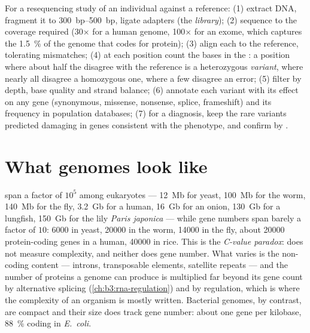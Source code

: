 \begin{method}\label{met:b3:genomics:pipeline}
For a resequencing study of an individual against a reference: (1)
extract DNA, fragment it to \qtyrange{300}{500}{bp}, ligate adapters
(the \emph{library}); (2) sequence to the coverage required (30$\times$
for a human genome, 100$\times$ for an exome, which captures the
\qty{1.5}{\%} of the genome that codes for protein); (3) align each
 to the reference, tolerating mismatches; (4) at each position
count the bases in the : a position where about half the 
disagree with the reference is a heterozygous \emph{variant}, where
nearly all disagree a homozygous one, where a few disagree an error;
(5) filter by depth, base quality and strand balance; (6) annotate each
variant with its effect on any gene (synonymous, missense, nonsense,
splice, frameshift) and its frequency in population databases; (7) for
a diagnosis, keep the rare variants predicted damaging in genes
consistent with the phenotype, and confirm by .
\end{method}

\section{What genomes look like}

\begin{proposition}\label{prop:b3:genomics:sizes}
 span a factor of $10^{5}$ among eukaryotes ---
\qty{12}{Mb} for yeast, \qty{100}{Mb} for the worm, \qty{140}{Mb} for
the fly, \qty{3.2}{Gb} for a human, \qty{16}{Gb} for an onion,
\qty{130}{Gb} for a lungfish, \qty{150}{Gb} for the lily \emph{Paris
japonica} --- while gene numbers span barely a factor of $10$:
\num{6000} in yeast, \num{20000} in the worm, \num{14000} in the fly,
about \num{20000} protein-coding genes in a human, \num{40000} in rice.
This is the \emph{C-value paradox}:  does not measure
complexity, and neither does gene number. What varies is the non-coding
content --- introns, transposable elements, satellite repeats --- and
the number of proteins a genome can produce is multiplied far beyond
its gene count by alternative splicing (\cref{ch:b3:rna-regulation})
and by regulation, which is where the complexity of an organism is
mostly written. Bacterial genomes, by contrast, are compact and their
size does track gene number: about one gene per kilobase, \qty{88}{\%}
coding in \emph{E.~coli}.
\end{proposition}


